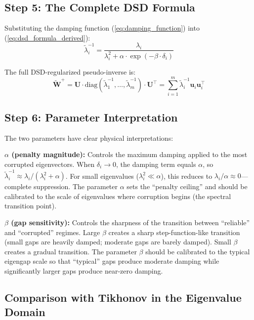 \documentclass[preprint,review,12pt]{elsarticle}
\begin{document}
\subsection{Step 5: The Complete DSD Formula}

Substituting the damping function (\ref{eq:damping_function}) into (\ref{eq:dsd_formula_derived}):
\begin{equation}
\boxed{\tilde{\lambda}_i^{-1} = \frac{\lambda_i}{\lambda_i^2 + \alpha \cdot \exp(-\beta \cdot \delta_i)}}
\label{eq:dsd_final}
\end{equation}

The full DSD-regularized pseudo-inverse is:
\begin{equation}
\tilde{\bm{W}}^+ = \bm{U} \cdot \text{diag}(\tilde{\lambda}_1^{-1}, \ldots, \tilde{\lambda}_m^{-1}) \cdot \bm{U}^\top = \sum_{i=1}^m \tilde{\lambda}_i^{-1} \bm{u}_i \bm{u}_i^\top
\label{eq:dsd_pseudoinverse}
\end{equation}

\subsection{Step 6: Parameter Interpretation}
\label{sec:param_interpretation}

The two parameters have clear physical interpretations:

\textbf{$\alpha$ (penalty magnitude):} Controls the maximum damping applied to the most corrupted eigenvectors. When $\delta_i \to 0$, the damping term equals $\alpha$, so $\tilde{\lambda}_i^{-1} \approx \lambda_i / (\lambda_i^2 + \alpha)$. For small eigenvalues ($\lambda_i^2 \ll \alpha$), this reduces to $\lambda_i / \alpha \approx 0$---complete suppression. The parameter $\alpha$ sets the ``penalty ceiling'' and should be calibrated to the scale of eigenvalues where corruption begins (the spectral transition point).

\textbf{$\beta$ (gap sensitivity):} Controls the sharpness of the transition between ``reliable'' and ``corrupted'' regimes. Large $\beta$ creates a sharp step-function-like transition (small gaps are heavily damped; moderate gaps are barely damped). Small $\beta$ creates a gradual transition. The parameter $\beta$ should be calibrated to the typical eigengap scale so that ``typical'' gaps produce moderate damping while significantly larger gaps produce near-zero damping.

\subsection{Comparison with Tikhonov in the Eigenvalue Domain}
\end{document}
